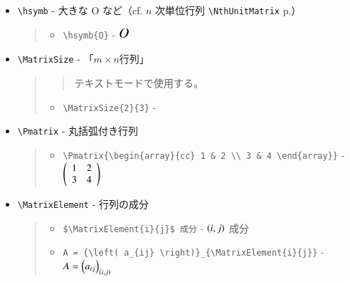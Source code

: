 \documentclass[oneside,10pt,a4paper]{jsarticle}
\begin{document}
  \begin{itemize}
    \item \verb|\hsymb| - 大きな O など（cf. $n$ 次単位行列 \verb|\NthUnitMatrix| p.\pageref{NthUnitMatrix}）
      \begin{quote}
        \Example
        \begin{itemize}
          \item \verb|\hsymb{O}| - $\hsymb{O}$
        \end{itemize}
      \end{quote}
    \item \verb|\MatrixSize| - 「$ m \times n $行列」
      \begin{quote}
        \Remark
        \begin{quote}
          テキストモードで使用する。
        \end{quote}
        \Example
        \begin{itemize}
          \item \verb|\MatrixSize{2}{3}| - 
        \end{itemize}
      \end{quote}
    \item \verb|\Pmatrix| - 丸括弧付き行列
      \begin{quote}
        \Example
        \begin{itemize}
          \item \verb|\Pmatrix{\begin{array}{cc} 1 & 2 \\ 3 & 4 \end{array}}| - $
              \left( 
                \begin{array}{cc}
                  1 & 2 \\
                  3 & 4
                \end{array}
               \right)
            $
        \end{itemize}
      \end{quote}
    \item \verb|\MatrixElement| - 行列の成分
      \begin{quote}
        \Example
        \begin{itemize}
          \item \verb|$\MatrixElement{i}{j}$ 成分| - $\left( i , j \right)$ 成分
          \item \verb|A = {\left( a_{ij} \right)}_{\MatrixElement{i}{j}}| - $A = {\left( a_{ij} \right)}_{\left( i , j \right)}$

\end{itemize}
\end{quote}
\end{itemize}
\end{document}
